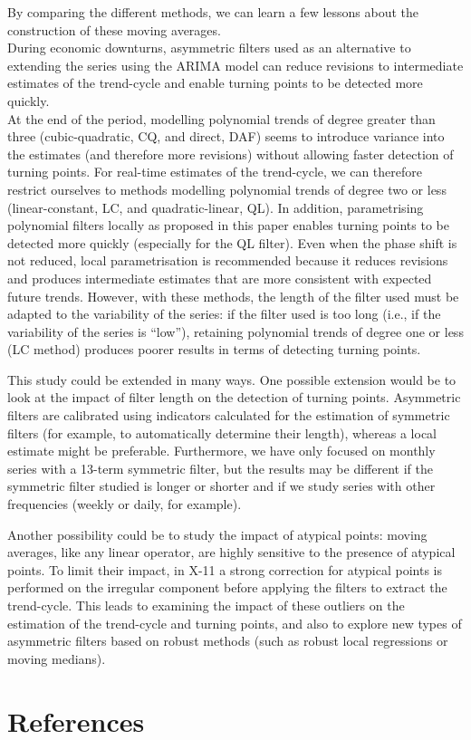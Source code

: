 \documentclass[
]{article}
\newcommand\1{\mathds{1}}
\begin{document}
By comparing the different methods, we can learn a few lessons about the
construction of these moving averages.\\
During economic downturns, asymmetric filters used as an alternative to
extending the series using the ARIMA model can reduce revisions to
intermediate estimates of the trend-cycle and enable turning points to
be detected more quickly.\\
At the end of the period, modelling polynomial trends of degree greater
than three (cubic-quadratic, CQ, and direct, DAF) seems to introduce
variance into the estimates (and therefore more revisions) without
allowing faster detection of turning points. For real-time estimates of
the trend-cycle, we can therefore restrict ourselves to methods
modelling polynomial trends of degree two or less (linear-constant, LC,
and quadratic-linear, QL). In addition, parametrising polynomial filters
locally as proposed in this paper enables turning points to be detected
more quickly (especially for the QL filter). Even when the phase shift
is not reduced, local parametrisation is recommended because it reduces
revisions and produces intermediate estimates that are more consistent
with expected future trends. However, with these methods, the length of
the filter used must be adapted to the variability of the series: if the
filter used is too long (i.e., if the variability of the series is
``low''), retaining polynomial trends of degree one or less (LC method)
produces poorer results in terms of detecting turning points.

This study could be extended in many ways. One possible extension would
be to look at the impact of filter length on the detection of turning
points. Asymmetric filters are calibrated using indicators calculated
for the estimation of symmetric filters (for example, to automatically
determine their length), whereas a local estimate might be preferable.
Furthermore, we have only focused on monthly series with a 13-term
symmetric filter, but the results may be different if the symmetric
filter studied is longer or shorter and if we study series with other
frequencies (weekly or daily, for example).

Another possibility could be to study the impact of atypical points:
moving averages, like any linear operator, are highly sensitive to the
presence of atypical points. To limit their impact, in X-11 a strong
correction for atypical points is performed on the irregular component
before applying the filters to extract the trend-cycle. This leads to
examining the impact of these outliers on the estimation of the
trend-cycle and turning points, and also to explore new types of
asymmetric filters based on robust methods (such as robust local
regressions or moving medians).

\newpage

\section*{References}\label{references}

\printbibliography[heading=none]
\end{document}
